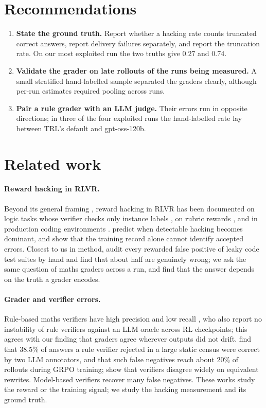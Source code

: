 \documentclass[10pt]{article}
\begin{document}
\section{Recommendations}
\label{sec:guidance}
\begin{enumerate}
\item \textbf{State the ground truth.} Report whether a hacking rate counts truncated correct answers, report
delivery failures separately, and report the truncation rate. On our most exploited run the two truths give 0.27
and 0.74.
\item \textbf{Validate the grader on late rollouts of the runs being measured.} A small stratified hand-labelled
sample separated the graders clearly, although per-run estimates required pooling across runs.
\item \textbf{Pair a rule grader with an LLM judge.} Their errors run in opposite directions; in three of the four
exploited runs the hand-labelled rate lay between TRL's default and gpt-oss-120b.
\end{enumerate}

\section{Related work}
\paragraph{Reward hacking in RLVR.} Beyond its general framing \citep{amodei2016concrete,skalse2022defining,gao2023scaling}, reward hacking in RLVR has been documented on logic tasks
whose verifier checks only instance labels \citep{helff2026gaming}, on rubric rewards \citep{wang2026rubric},
and in production coding environments \citep{baker2025monitoring,anthropic2025emergent}.
\citet{deng2026simhack} predict when detectable hacking becomes dominant, and \citet{moya2026verifier} show
that the training record alone cannot identify accepted errors. Closest to us in method, \citet{zhang2026leaky}
audit every rewarded false positive of leaky code test suites by hand and find that about half are genuinely
wrong; we ask the same question of maths graders across a run, and find that the answer depends on the truth a
grader encodes.

\paragraph{Grader and verifier errors.} Rule-based maths verifiers have high precision and low recall
\citep{huang2025verifiers}, who also report no instability of rule verifiers against an LLM oracle across RL
checkpoints; this agrees with our finding that graders agree wherever outputs did not drift.
\citet{xu2025tinyv} find that 38.5\% of answers a rule verifier rejected in a large static census were correct by two
LLM annotators, and that such false negatives reach about 20\% of rollouts during GRPO training; \citet{xin2026verifier} show that verifiers disagree widely on equivalent rewrites.
Model-based verifiers \citep{chen2025xverify,compassverifier} recover many false negatives. These works study the
reward or the training signal; we study the hacking measurement and its ground truth.
\end{document}
